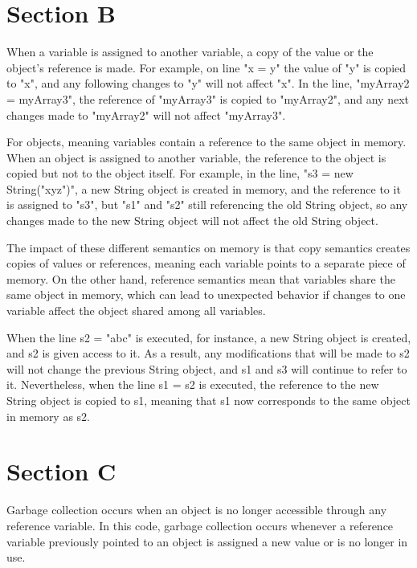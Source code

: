 \documentclass{assignment}
\begin{document}
\section*{Section B}
When a variable is assigned to another variable, a copy of the value or the object's reference is made. For example, on line "x = y" the value of "y" is copied to "x", and any following changes to "y" will not affect "x". In the line, "myArray2 = myArray3", the reference of "myArray3" is copied to "myArray2", and any next changes made to "myArray2" will not affect "myArray3".

For objects, meaning variables contain a reference to the same object in memory. When an object is assigned to another variable, the reference to the object is copied but not to the object itself. For example, in the line, "s3 = new String("xyz")", a new String object is created in memory, and the reference to it is assigned to "s3", but "s1" and "s2" still referencing the old String object, so any changes made to the new String object will not affect the old String object.

The impact of these different semantics on memory is that copy semantics creates copies of values or references, meaning each variable points to a separate piece of memory. On the other hand, reference semantics mean that variables share the same object in memory, which can lead to unexpected behavior if changes to one variable affect the object shared among all variables.

When the line s2 = "abc" is executed, for instance, a new String object is created, and s2 is given access to it. As a result, any modifications that will be made to s2 will not change the previous String object, and s1 and s3 will continue to refer to it. Nevertheless, when the line s1 = s2 is executed, the reference to the new String object is copied to s1, meaning that s1 now corresponds to the same object in memory as s2.

\section*{Section C}
Garbage collection occurs when an object is no longer accessible through any reference variable. In this code, garbage collection occurs whenever a reference variable previously pointed to an object is assigned a new value or is no longer in use.
\end{document}
